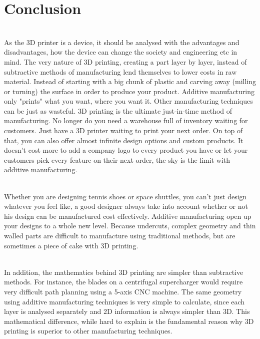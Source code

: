 \documentclass[12pt,a4paper]{report}
\begin{document}
	\chapter*{Conclusion}
	
	\noindent
	\\As the 3D printer is a device, it should be analysed with the advantages and disadvantages,
	how the device can change the society and engineering etc in mind. The very nature of 3D printing,
	creating a part layer by layer, instead of subtractive methods of manufacturing lend themselves to
	lower costs in raw material. Instead of starting with a big chunk of plastic and carving away
	(milling or turning) the surface in order to produce your product. Additive manufacturing only
	"prints" what you want, where you want it. Other manufacturing techniques can be just as wasteful.
	3D printing is the ultimate just-in-time method of manufacturing. No longer do you need a
	warehouse full of inventory waiting for customers. Just have a 3D printer waiting to print your next
	order. On top of that, you can also offer almost infinite design options and custom products. It
	doesn't cost more to add a company logo to every product you have or let your customers pick
	every feature on their next order, the sky is the limit with additive manufacturing.
	\par
	
	\noindent
	\\Whether you are designing tennis shoes or space shuttles, you can't just design whatever you
	feel like, a good designer always take into account whether or not his design can be manufactured
	cost effectively. Additive manufacturing open up your designs to a whole new level. Because
	undercuts, complex geometry and thin walled parts are difficult to manufacture using traditional
	methods, but are sometimes a piece of cake with 3D printing.
	\par
	
	\noindent
	\\In addition, the mathematics behind 3D printing are simpler than subtractive methods. For
	instance, the blades on a centrifugal supercharger would require very difficult path planning using a
	5-axis CNC machine. The same geometry using additive manufacturing techniques is very simple to
	calculate, since each layer is analysed separately and 2D information is always simpler than 3D.
	This mathematical difference, while hard to explain is the fundamental reason why 3D printing is
	superior to other manufacturing techniques. 
	\par
	
\end{document}
